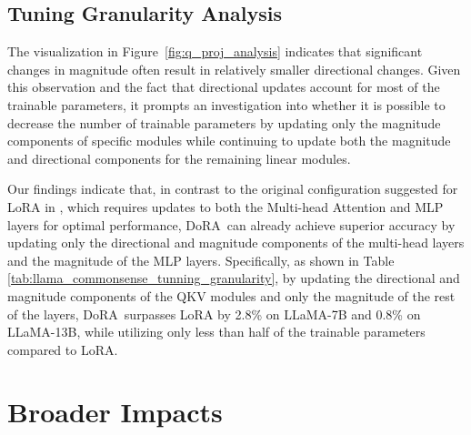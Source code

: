 \documentclass{article}
\newcommand{\ours}{DoRA}
\theoremstyle{plain}
\theoremstyle{definition}
\theoremstyle{remark}
\begin{document}
\subsection{Tuning Granularity Analysis}

The visualization in Figure~\ref{fig:q_proj_analysis} indicates that significant changes in magnitude often result in relatively smaller directional changes. Given this observation and the fact that directional updates account for most of the trainable parameters, it prompts an investigation into whether it is possible to decrease the number of trainable parameters by updating only the magnitude components of specific modules while continuing to update both the magnitude and directional components for the remaining linear modules.

Our findings indicate that, in contrast to the original configuration suggested for LoRA in \cite{hu2023llmadapters}, which requires updates to both the Multi-head Attention and MLP layers for optimal performance, \ours~can already achieve superior accuracy by updating only the directional and magnitude components of the multi-head layers and the magnitude of the MLP layers. Specifically, as shown in Table \ref{tab:llama_commonsense_tunning_granularity}, by updating the directional and magnitude components of the QKV modules and only the magnitude of the rest of the layers, \ours~surpasses LoRA by 2.8\% on LLaMA-7B and 0.8\% on LLaMA-13B, while utilizing only less than half of the trainable parameters compared to LoRA.

\section{Broader Impacts}
\end{document}
